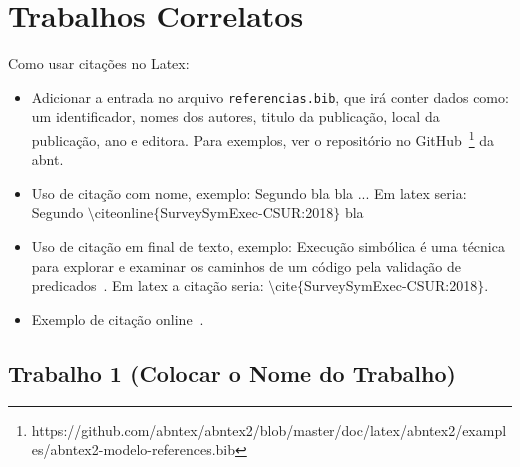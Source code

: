 \chapter{Trabalhos Correlatos}
\label{chap:trabcorrelatos}


Como usar citações no Latex:
\begin{itemize}
    \item Adicionar a entrada no arquivo \texttt{referencias.bib}, que irá conter dados como: um identificador, nomes dos autores, titulo da publicação, local da publicação, ano e editora. Para exemplos, ver o repositório no  GitHub~\footnote{https://github.com/abntex/abntex2/blob/master/doc/latex/abntex2/examples/abntex2-modelo-references.bib} da abnt.
    \item Uso de citação com nome, exemplo: Segundo  bla bla ... Em latex seria: Segundo $\setminus$citeonline$\{$SurveySymExec-CSUR:2018$\}$ bla
     \item Uso de citação em final de texto, exemplo: Execução simbólica é uma técnica para explorar e examinar os caminhos de um código pela validação de predicados~\cite{SurveySymExec-CSUR:2018}. Em latex a citação seria: $\setminus$cite$\{$SurveySymExec-CSUR:2018$\}$.
    \item Exemplo de citação online~\cite{facebook50m}.
\end{itemize}

\section{Trabalho 1 (Colocar o Nome do Trabalho)}


